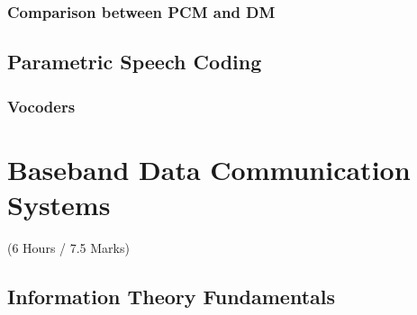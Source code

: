 \documentclass[12pt]{article}
\begin{document}
    \subsubsection{Comparison between PCM and DM}
	\subsection{Parametric Speech Coding}
    	\subsubsection{Vocoders}

\pagebreak

\section{Baseband Data Communication Systems}
  \begin{center}(6 Hours / 7.5 Marks)\end{center}

  \subsection{Information Theory Fundamentals}
\end{document}
